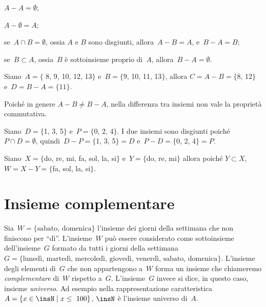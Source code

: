 \begin{enumeratea}
\item $A-A=\emptyset$;
\item $A-\emptyset =A$;
\item se~$A\cap B=\emptyset $, ossia $A$ e $B$ sono disgiunti, allora~$A-B=A$, e~$B-A=B$;
\item se~$B\subset A$, ossia~$B$ è sottoinsieme proprio di~$A$, allora~$B-A=\emptyset $.
\end{enumeratea}

\begin{exrig}
 \begin{esempio}
Siano~$A=\{$ 8, 9, 10, 12, 13$\}$ e~$B=\{$9, 10, 11, 13$\}$, allora
$C=A-B=\{$8, 12$\}$ e~$D=B-A=\{11\}$.
 \end{esempio}
\end{exrig}

Poiché in genere $A-B\neq B-A$, nella differenza tra insiemi non vale la proprietà
commutativa.

\begin{exrig}
 \begin{esempio}
Siano~$D=\{$1, 3, 5$\}$ e~$P=\{$0, 2, 4$\}$. I due insiemi sono disgiunti poiché ~$P\cap D=\emptyset$,
 quindi~$D-P=\{$1, 3, 5$\}=D$ e~$P-D=\{$0, 2, 4$\}=P$.
\begin{center}
 
\end{center}
 \end{esempio}

 \begin{esempio}
Siano~$X=\{$do, re, mi, fa, sol, la, si$\}$
e~$Y=\{$do, re, mi$\}$ allora poiché
$Y\subset X$, $W=X-Y=\{$fa, sol, la, si$\}$.
\begin{center}
 
\end{center}
 \end{esempio}
\end{exrig}

\ovalbox{\risolvii \ref{ese:7.20}, \ref{ese:7.21}, \ref{ese:7.22}}

\section{Insieme complementare}

Sia~$W=\{\text{sabato, domenica}\}$ l'insieme dei giorni della settimana che non finiscono per ``dì''.
L'insieme~$W$ può essere considerato come sottoinsieme dell'insieme~$G$ formato da tutti i giorni della settimana
$G=\{\text{lunedì, martedì, mercoledì, giovedì, venerdì, sabato, domenica}\}$.
L'insieme degli elementi di~$G$ che non appartengono a~$W$ forma
un insieme che chiameremo \emph{complementare} di~$W$ rispetto a~$G$. L'insieme~$G$ invece si dice, in questo caso, insieme \emph{universo}. Ad esempio
nella rappresentazione caratteristica~$A=\{x\in\insN\mid x\le~100\}$,
$\insN$ è l'insieme universo di~$A$.

